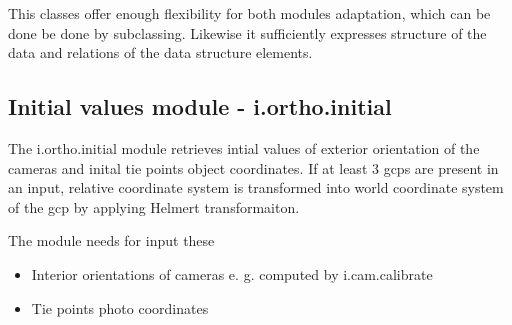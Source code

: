 \documentclass[a4paper,12pt]{report}
\begin{document}
This classes offer enough flexibility for both modules adaptation, which can be done be done by subclassing. 
Likewise it sufficiently expresses  structure of the data and relations of the data structure elements.

\subsection{Initial values module - i.ortho.initial}

The i.ortho.initial module retrieves intial values of exterior orientation of the cameras and inital tie points object coordinates. If at least 3 gcps are 
present in an input, relative coordinate system is transformed into world coordinate system of the gcp by applying Helmert transformaiton. 


The module needs for input these 
\begin{itemize}
\item Interior orientations of cameras e. g. computed by i.cam.calibrate
\item Tie points photo coordinates 
\end{itemize}
\end{document}

